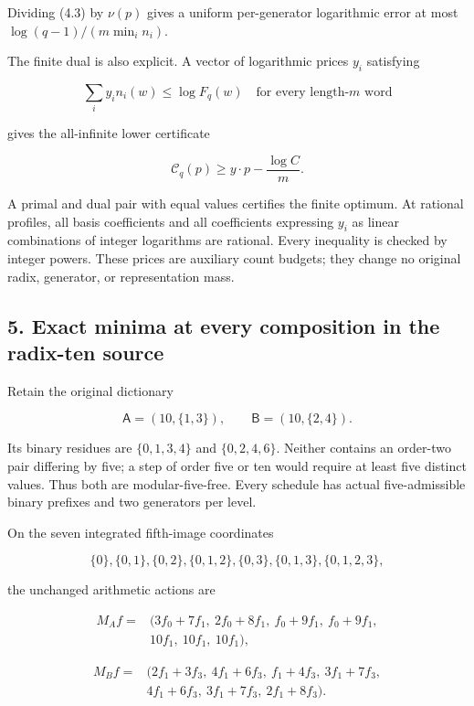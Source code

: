 \documentclass[11pt,a4paper]{article}
\begin{document}
Dividing (4.3) by \(\nu(p)\) gives a uniform per-generator logarithmic error at most \(\log(q-1)/(m\min_i n_i)\).

The finite dual is also explicit. A vector of logarithmic prices \(y_i\) satisfying

\[
\sum_i y_i n_i(w)\le\log F_q(w)
\quad\text{for every length-}m\text{ word}
\tag{4.4}
\]

gives the all-infinite lower certificate

\[
\mathcal C_q(p)\ge y\cdot p-\frac{\log C}{m}.
\tag{4.5}
\]

A primal and dual pair with equal values certifies the finite optimum. At rational profiles, all basis coefficients and all coefficients expressing \(y_i\) as linear combinations of integer logarithms are rational. Every inequality is checked by integer powers. These prices are auxiliary count budgets; they change no original radix, generator, or representation mass.

\subsection{5. Exact minima at every composition in the radix-ten source}\label{eporig:exact-minima-at-every-composition-in-the-radix-ten-source}

Retain the original dictionary

\[
\mathsf A=(10,\{1,3\}),\qquad
\mathsf B=(10,\{2,4\}).
\tag{5.1}
\]

Its binary residues are \(\{0,1,3,4\}\) and \(\{0,2,4,6\}\). Neither contains an order-two pair differing by five; a step of order five or ten would require at least five distinct values. Thus both are modular-five-free. Every schedule has actual five-admissible binary prefixes and two generators per level.

On the seven integrated fifth-image coordinates

\[
\{0\},\{0,1\},\{0,2\},\{0,1,2\},
\{0,3\},\{0,1,3\},\{0,1,2,3\},
\]

the unchanged arithmetic actions are

\[
\begin{split}
M_Af={}&(3f_0+7f_1,\ 2f_0+8f_1,\ f_0+9f_1,\ f_0+9f_1,\\
&10f_1,\ 10f_1,\ 10f_1),
\end{split}
\]

\[
\begin{split}
M_Bf={}&(2f_1+3f_3,\ 4f_1+6f_3,\ f_1+4f_3,\ 3f_1+7f_3,\\
&4f_1+6f_3,\ 3f_1+7f_3,\ 2f_1+8f_3).
\end{split}
\tag{5.2}
\]
\end{document}

